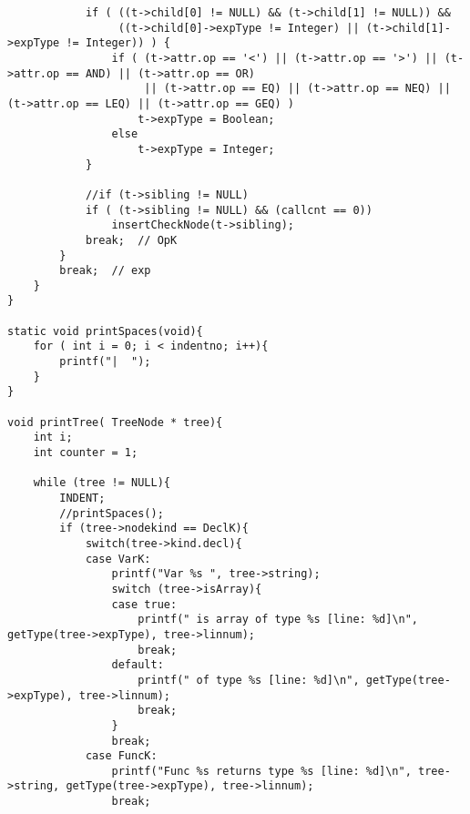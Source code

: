 \documentclass[12pt]{book}
\begin{document}
\begin{lstlisting}
            if ( ((t->child[0] != NULL) && (t->child[1] != NULL)) && 
                 ((t->child[0]->expType != Integer) || (t->child[1]->expType != Integer)) ) {  
                if ( (t->attr.op == '<') || (t->attr.op == '>') || (t->attr.op == AND) || (t->attr.op == OR) 
                     || (t->attr.op == EQ) || (t->attr.op == NEQ) || (t->attr.op == LEQ) || (t->attr.op == GEQ) )
                    t->expType = Boolean;   
                else   
                    t->expType = Integer;   
            }

            //if (t->sibling != NULL)
            if ( (t->sibling != NULL) && (callcnt == 0))
                insertCheckNode(t->sibling);
            break;  // OpK
        }
        break;  // exp
    }
}

static void printSpaces(void){
    for ( int i = 0; i < indentno; i++){
        printf("|  ");
    }
}

void printTree( TreeNode * tree){
    int i; 
    int counter = 1; 

    while (tree != NULL){
        INDENT;
        //printSpaces();
        if (tree->nodekind == DeclK){  
            switch(tree->kind.decl){
            case VarK:
                printf("Var %s ", tree->string);
                switch (tree->isArray){
                case true:
                    printf(" is array of type %s [line: %d]\n", getType(tree->expType), tree->linnum);
                    break;
                default:
                    printf(" of type %s [line: %d]\n", getType(tree->expType), tree->linnum);
                    break;
                }
                break;
            case FuncK:
                printf("Func %s returns type %s [line: %d]\n", tree->string, getType(tree->expType), tree->linnum);
                break;


\end{lstlisting}
\end{document}
